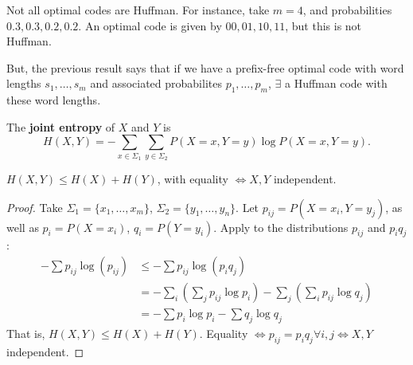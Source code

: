 \documentclass{article}
\begin{document}
\begin{remark}
    Not all optimal codes are Huffman. For instance, take $m=4$, and probabilities $0.3, 0.3, 0.2, 0.2$. An optimal code is given by $00, 01, 10, 11$, but this is not Huffman.

    But, the previous result says that if we have a prefix-free optimal code with word lengths $s_1, \dotsc, s_m$ and associated probabilites $p_1, \dotsc, p_m$, $\exists$ a Huffman code with these word lengths.
\end{remark}

\begin{defi}
    The \textbf{joint entropy} of $X$ and $Y$ is
    \begin{equation*}
        H(X,Y) = - \sum_{x \in \Sigma_1} \sum_{y \in \Sigma_2} P(X=x, Y=y) \log P(X=x, Y=y).
    \end{equation*}
\end{defi}

\begin{nlemma}
    $H(X, Y) \leq H(X) + H(Y)$, with equality $\iff X,Y$ independent.
\end{nlemma}

\begin{proof}
    Take $\Sigma_1 = \{x_1, \dotsc, x_m\}$, $\Sigma_2 = \{y_1, \dotsc, y_n\}$. Let $p_{ij} = P(X=x_i, Y=y_j)$, as well as $p_i = P(X=x_i)$, $q_i = P(Y=y_i)$.
    Apply  to the distributions $p_{ij}$ and $p_i q_j$:
    \begin{align*}
        -\sum p_{ij} \log(p_{ij}) &\leq -\sum p_{ij} \log(p_i q_j) \\
                                  &= - \sum_i \left(\sum_j p_{ij} \log p_i\right) - \sum_j \left(\sum_i p_{ij} \log q_j\right) \\
                                  &= -\sum p_i \log p_i - \sum q_j \log q_j
    \end{align*}
    That is, $H(X,Y) \leq H(X) + H(Y)$.
    Equality $\iff p_{ij} = p_i q_j \forall i, j \iff X, Y$ independent.
\end{proof}

\end{document}
